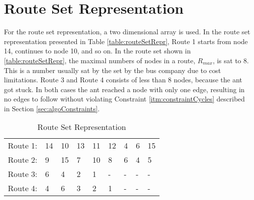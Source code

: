 \section{Route Set Representation}
For the route set representation, a two dimensional array is used. In the route set representation presented in Table \vref{table:routeSetRepr}, Route 1 starts from node 14, continues to node 10, and so on. In the route set shown in \vref{table:routeSetRepr}, the maximal numbers of nodes in a route, $R_{max}$, is sat to 8. This is a number usually sat by the set by the bus company due to cost limitations. Route 3 and Route 4 consists of less than 8 nodes, because the ant got stuck. In both cases the ant reached a node with only one edge, resulting in no edges to follow without violating Constraint \ref{itm:constraintCycles} described in Section \vref{sec:algoConstraints}.
\begin{table}[H]
    \begin{center}
        \begin{tabular}{|l| l l l l l l l l|}
      \hline
        Route 1: & 14 & 10 & 13 & 11 & 12 & 4 & 6 & 15 \\
        Route 2: & 9 & 15 & 7 & 10 & 8 & 6 & 4 & 5 \\
        Route 3: & 6 & 4 & 2 & 1 & - & - & - & - \\
        Route 4: & 4 & 6 & 3 & 2 & 1 & - & - & - \\
      \hline
        \end{tabular}
    \end{center}
    \caption {Route Set Representation}
    \label{table:routeSetRepr}
\end{table}